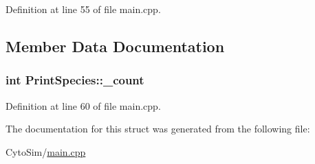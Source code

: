 Definition at line 55 of file main.\-cpp.



\subsection{Member Data Documentation}
\hypertarget{structPrintSpecies_a80f72f29171978030df3a06bec02247a}{
\subsubsection[{\-\_\-count}]{\setlength{\rightskip}{0pt plus 5cm}int {\bf Print\-Species\-::\-\_\-count}}}\label{structPrintSpecies_a80f72f29171978030df3a06bec02247a}


Definition at line 60 of file main.\-cpp.



The documentation for this struct was generated from the following file\-:\begin{DoxyCompactItemize}
\item 
Cyto\-Sim/\hyperlink{main_8cpp}{main.\-cpp}\end{DoxyCompactItemize}
